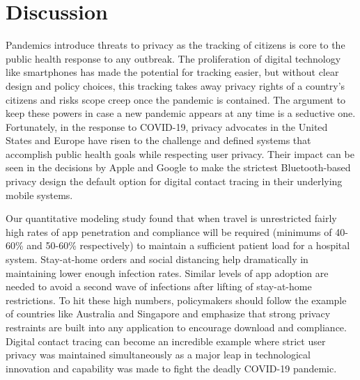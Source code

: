 \documentclass{article}
\begin{document}
\section{Discussion}
Pandemics introduce threats to privacy as the tracking of citizens is core to the public health response to any outbreak. The proliferation of digital technology like smartphones has made the potential for tracking easier, but without clear design and policy choices, this tracking takes away privacy rights of a country’s citizens and risks scope creep once the pandemic is contained. The argument to keep these powers in case a new pandemic appears at any time is a seductive one. Fortunately, in the response to COVID-19, privacy advocates in the United States and Europe have risen to the challenge and defined systems that accomplish public health goals while respecting user privacy. Their impact can be seen in the decisions by Apple and Google to make the strictest Bluetooth-based privacy design the default option for digital contact tracing in their underlying mobile systems.

Our quantitative modeling study found that when travel is unrestricted fairly high rates of app penetration and compliance will be required (minimums of 40-60\% and 50-60\% respectively) to maintain a sufficient patient load for a hospital system. Stay-at-home orders and social distancing help dramatically in maintaining lower enough infection rates. Similar levels of app adoption are needed to avoid a second wave of infections after lifting of stay-at-home restrictions. To hit these high numbers, policymakers should follow the example of countries like Australia and Singapore and emphasize that strong privacy restraints are built into any application to encourage download and compliance. Digital contact tracing can become an incredible example where strict user privacy was maintained simultaneously as a major leap in technological innovation and capability was made to fight the deadly COVID-19 pandemic. 

\printbibliography
\end{document}
